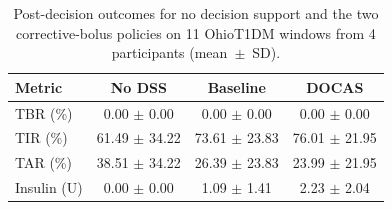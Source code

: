\begin{table}[pos=htbp,width=0.72\linewidth]
\centering
\caption{Post-decision outcomes for no decision support and the two corrective-bolus policies on 11 OhioT1DM windows from 4 participants (mean~$\pm$~SD).}
\label{tab:replay}
\scriptsize
\begin{tabular}{lccc}
\toprule
Metric & No DSS & Baseline & DOCAS \\
\midrule
TBR (\%) & 0.00 $\pm$ 0.00 & 0.00 $\pm$ 0.00 & 0.00 $\pm$ 0.00 \\
TIR (\%) & 61.49 $\pm$ 34.22 & 73.61 $\pm$ 23.83 & 76.01 $\pm$ 21.95 \\
TAR (\%) & 38.51 $\pm$ 34.22 & 26.39 $\pm$ 23.83 & 23.99 $\pm$ 21.95 \\
Insulin (U) & 0.00 $\pm$ 0.00 & 1.09 $\pm$ 1.41 & 2.23 $\pm$ 2.04 \\
\bottomrule
\end{tabular}
\end{table}
